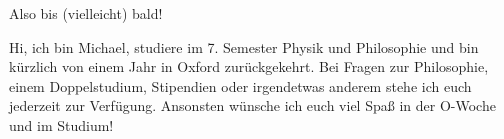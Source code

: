 \begin{multicols*}{2}
{Also bis (vielleicht) bald! }

{Hi, ich bin Michael, studiere im 7. Semester Physik und Philosophie und bin kürzlich von einem Jahr in Oxford zurückgekehrt. Bei Fragen zur Philosophie, einem Doppelstudium, Stipendien oder irgendetwas anderem stehe ich euch jederzeit zur Verfügung. Ansonsten wünsche ich euch viel Spaß in der O-Woche und im Studium!}


\end{multicols*}
